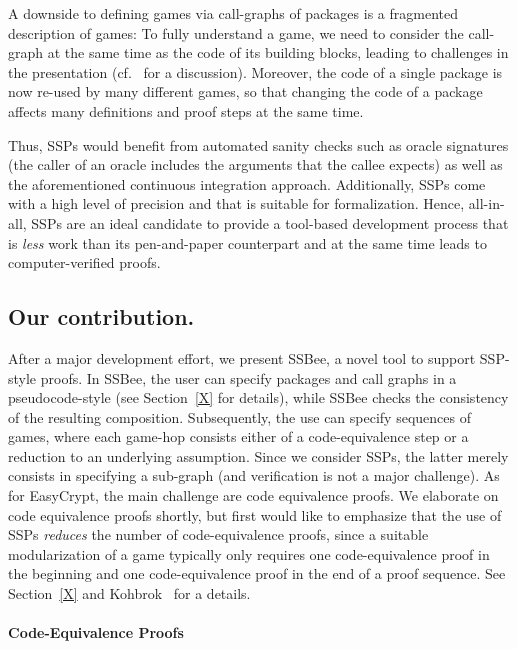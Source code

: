 A downside to defining games via call-graphs of packages is a fragmented
description of games: To fully understand a game, we need to consider the
call-graph at the same time as the code of its building blocks, leading
to challenges in the presentation (cf.~\cite{ACNS:BEP24} for a discussion).
Moreover, the code of a single package is now re-used by many different games, 
so that changing the code of a package affects many definitions and proof 
steps at the same time.

Thus, SSPs would benefit from automated sanity checks such as oracle signatures
(the caller of an oracle includes the arguments that the callee expects) as
well as the aforementioned continuous integration approach.
Additionally, SSPs come with a high level of precision and
that is suitable for formalization. Hence, all-in-all, SSPs are an ideal
candidate to provide a tool-based development process
that is \emph{less} work than its pen-and-paper counterpart
and at the same time leads to computer-verified proofs.


\subsection{Our contribution.} After a major development effort,
we present SSBee, a novel tool to support SSP-style proofs. 
In SSBee, the user can specify packages and call graphs in a 
pseudocode-style (see Section~\ref{X} for details), while SSBee
checks the consistency of the resulting composition. Subsequently,
the use can specify sequences of games, where each game-hop consists
either of a code-equivalence step or a reduction to an underlying
assumption. Since we consider SSPs, the latter merely consists in
specifying a sub-graph (and verification is not a major challenge).
As for EasyCrypt, the main challenge are code equivalence proofs.
We elaborate on code equivalence proofs shortly, but first would
like to emphasize that the use of SSPs \emph{reduces} the number
of code-equivalence proofs, since a suitable modularization of a game
typically only requires one code-equivalence proof in the beginning
and one code-equivalence proof in the end of a proof sequence.
See Section~\ref{X} and Kohbrok~\cite{Kohbrok:thesis} for a details.

\paragraph{Code-Equivalence Proofs}






